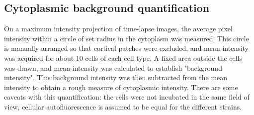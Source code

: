 \documentclass[9pt,lineno]{elife}
\begin{document}
\subsection{Cytoplasmic background quantification}
On a maximum intensity projection of time-lapse images, the average pixel intensity within a circle of set radius in the cytoplasm was measured. This circle is manually arranged so that cortical patches were excluded, and mean intensity was acquired for about 10 cells of each cell type. A fixed area outside the cells was drawn, and mean intensity was calculated to establish "background intensity". This background intensity was then subtracted from the mean intensity to obtain a rough measure of cytoplasmic intensity. There are some caveats with this quantification: the cells were not incubated in the same field of view, cellular autofluorescence is assumed to be equal for the different strains.





\end{document}
